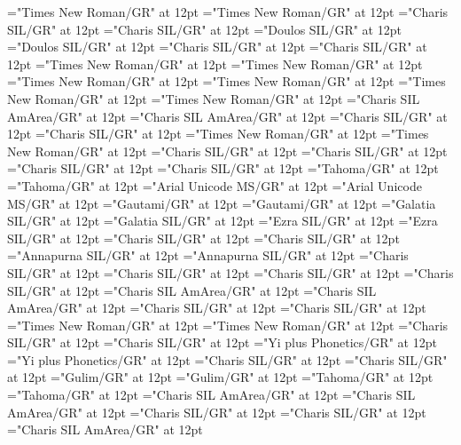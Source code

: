 \documentclass[a4paper]{article}
\begin{document}
\pagestyle{plain}
\sloppy
\setlength{\parfillskip}{0pt plus 1fil}
\font\divarIQ="Times New Roman/GR" at 12pt
\font\spanarIQ="Times New Roman/GR" at 12pt
\font\divbn="Charis SIL/GR" at 12pt
\font\spanbn="Charis SIL/GR" at 12pt
\font\divbzhfonipa="Doulos SIL/GR" at 12pt
\font\spanbzhfonipa="Doulos SIL/GR" at 12pt
\font\divbzh="Charis SIL/GR" at 12pt
\font\spanbzh="Charis SIL/GR" at 12pt
\font\divde="Times New Roman/GR" at 12pt
\font\spande="Times New Roman/GR" at 12pt
\font\divenfonipa="Times New Roman/GR" at 12pt
\font\spanenfonipa="Times New Roman/GR" at 12pt
\font\diven="Times New Roman/GR" at 12pt
\font\spanen="Times New Roman/GR" at 12pt
\font\divesaab="Charis SIL AmArea/GR" at 12pt
\font\spanesaab="Charis SIL AmArea/GR" at 12pt
\font\dives="Charis SIL/GR" at 12pt
\font\spanes="Charis SIL/GR" at 12pt
\font\divfa="Times New Roman/GR" at 12pt
\font\spanfa="Times New Roman/GR" at 12pt
\font\divfrZxxxxaudio="Charis SIL/GR" at 12pt
\font\spanfrZxxxxaudio="Charis SIL/GR" at 12pt
\font\divfr="Charis SIL/GR" at 12pt
\font\spanfr="Charis SIL/GR" at 12pt
\font\divggofonipaxemic="Tahoma/GR" at 12pt
\font\spanggofonipaxemic="Tahoma/GR" at 12pt
\font\divggoINxaheri="Arial Unicode MS/GR" at 12pt
\font\spanggoINxaheri="Arial Unicode MS/GR" at 12pt
\font\divggoTeluIN="Gautami/GR" at 12pt
\font\spanggoTeluIN="Gautami/GR" at 12pt
\font\divgrc="Galatia SIL/GR" at 12pt
\font\spangrc="Galatia SIL/GR" at 12pt
\font\divhbo="Ezra SIL/GR" at 12pt
\font\spanhbo="Ezra SIL/GR" at 12pt
\font\divhe="Charis SIL/GR" at 12pt
\font\spanhe="Charis SIL/GR" at 12pt
\font\divhi="Annapurna SIL/GR" at 12pt
\font\spanhi="Annapurna SIL/GR" at 12pt
\font\divhu="Charis SIL/GR" at 12pt
\font\spanhu="Charis SIL/GR" at 12pt
\font\divibafonipa="Charis SIL/GR" at 12pt
\font\spanibafonipa="Charis SIL/GR" at 12pt
\font\diviba="Charis SIL AmArea/GR" at 12pt
\font\spaniba="Charis SIL AmArea/GR" at 12pt
\font\dividZxxxxaudio="Charis SIL/GR" at 12pt
\font\spanidZxxxxaudio="Charis SIL/GR" at 12pt
\font\divid="Times New Roman/GR" at 12pt
\font\spanid="Times New Roman/GR" at 12pt
\font\diviixpin="Charis SIL/GR" at 12pt
\font\spaniixpin="Charis SIL/GR" at 12pt
\font\divii="Yi plus Phonetics/GR" at 12pt
\font\spanii="Yi plus Phonetics/GR" at 12pt
\font\divkm="Charis SIL/GR" at 12pt
\font\spankm="Charis SIL/GR" at 12pt
\font\divko="Gulim/GR" at 12pt
\font\spanko="Gulim/GR" at 12pt
\font\divlv="Tahoma/GR" at 12pt
\font\spanlv="Tahoma/GR" at 12pt
\font\divmiz="Charis SIL AmArea/GR" at 12pt
\font\spanmiz="Charis SIL AmArea/GR" at 12pt
\font\divms="Charis SIL/GR" at 12pt
\font\spanms="Charis SIL/GR" at 12pt
\font\divmxbfonipa="Charis SIL AmArea/GR" at 12pt
\end{document}
